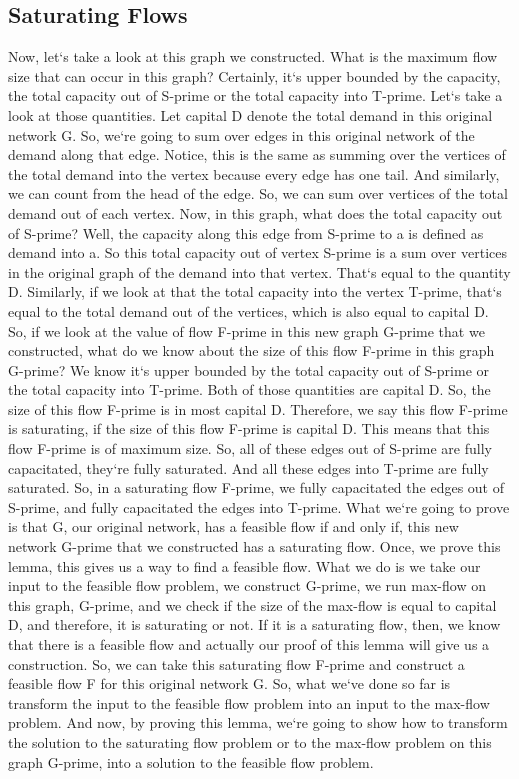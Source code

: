 \subsection{Saturating Flows}
Now, let`s take a look at this graph we constructed.
What is the maximum flow size that can occur in this graph? Certainly, it`s upper bounded by the capacity, the total capacity out of S-prime or the total capacity into T-prime.
Let`s take a look at those quantities.
Let capital D denote the total demand in this original network G\@.
So, we`re going to sum over edges in this original network of the demand along that edge.
Notice, this is the same as summing over the vertices of the total demand into the vertex because every edge has one tail.
And similarly, we can count from the head of the edge.
So, we can sum over vertices of the total demand out of each vertex.
Now, in this graph, what does the total capacity out of S-prime? Well, the capacity along this edge from S-prime to a is defined as demand into a.
So this total capacity out of vertex S-prime is a sum over vertices in the original graph of the demand into that vertex.
That`s equal to the quantity D\@.
Similarly, if we look at that the total capacity into the vertex T-prime, that`s equal to the total demand out of the vertices, which is also equal to capital D\@.
So, if we look at the value of flow F-prime in this new graph G-prime that we constructed, what do we know about the size of this flow F-prime in this graph G-prime? We know it`s upper bounded by the total capacity out of S-prime or the total capacity into T-prime.
Both of those quantities are capital D\@.
So, the size of this flow F-prime is in most capital D\@.
Therefore, we say this flow F-prime is saturating, if the size of this flow F-prime is capital D\@.
This means that this flow F-prime is of maximum size.
So, all of these edges out of S-prime are fully capacitated, they`re fully saturated.
And all these edges into T-prime are fully saturated.
So, in a saturating flow F-prime, we fully capacitated the edges out of S-prime, and fully capacitated the edges into T-prime.
What we`re going to prove is that G, our original network, has a feasible flow if and only if, this new network G-prime that we constructed has a saturating flow.
Once, we prove this lemma, this gives us a way to find a feasible flow.
What we do is we take our input to the feasible flow problem, we construct G-prime, we run max-flow on this graph, G-prime, and we check if the size of the max-flow is equal to capital D, and therefore, it is saturating or not.
If it is a saturating flow, then, we know that there is a feasible flow and actually our proof of this lemma will give us a construction.
So, we can take this saturating flow F-prime and construct a feasible flow F for this original network G\@.
So, what we`ve done so far is transform the input to the feasible flow problem into an input to the max-flow problem.
And now, by proving this lemma, we`re going to show how to transform the solution to the saturating flow problem or to the max-flow problem on this graph G-prime, into a solution to the feasible flow problem.


